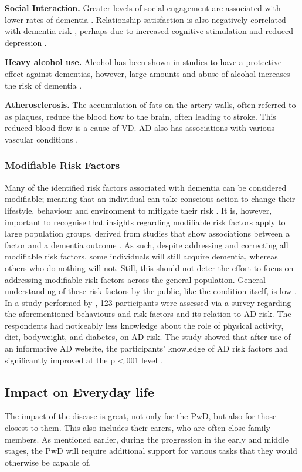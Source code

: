 \textbf{Social Interaction.}
Greater levels of social engagement are associated with lower rates of dementia \cite{Saczynski2006, Fratiglioni2000}. Relationship satisfaction is also negatively correlated with dementia risk \cite{Amieva2010}, perhaps due to increased cognitive stimulation and reduced depression \cite{Saczynski2010}.

\textbf{Heavy alcohol use.}
Alcohol has been shown in studies to have a protective effect against dementias, however, large amounts and abuse of alcohol increases the risk of dementia \cite{AlzheimerEurope2015}.

\textbf{Atherosclerosis.}
The accumulation of fats on the artery walls, often referred to as plaques, reduce the blood flow to the brain, often leading to stroke. This reduced blood flow is a cause of VD. AD also has associations with various vascular conditions \cite{Dolan2010}.

\subsubsection{Modifiable Risk Factors}
Many of the identified risk factors associated with dementia can be considered modifiable; meaning that an individual can take conscious action to change their lifestyle, behaviour and environment to mitigate their risk \cite{AlzheimersAssociation2015b}. It is, however, important to recognise that insights regarding modifiable risk factors apply to large population groups, derived from studies that show associations between a factor and a dementia outcome \cite{Baumgart2015}. As such, despite addressing and correcting all modifiable risk factors, some individuals will still acquire dementia, whereas others who do nothing will not. Still, this should not deter the effort to focus on addressing modifiable risk factors across the general population. General understanding of these risk factors by the public, like the condition itself, is low \cite{Farrow2013}. In a study performed by \cite{Farrow2013}, 123 participants were assessed via a survey regarding the aforementioned behaviours and risk factors and its relation to AD risk. The respondents had noticeably less knowledge about the role of physical activity, diet, bodyweight, and diabetes, on AD risk. The study showed that after use of an informative AD website, the participants' knowledge of AD risk factors had significantly improved at the p \textless .001 level \cite{Farrow2013}.

\subsection{Impact on Everyday life}
The impact of the disease is great, not only for the PwD, but also for those closest to them. This also includes their carers, who are often close family members. As mentioned earlier, during the progression in the early and middle stages, the PwD will require additional support for various tasks that they would otherwise be capable of.


